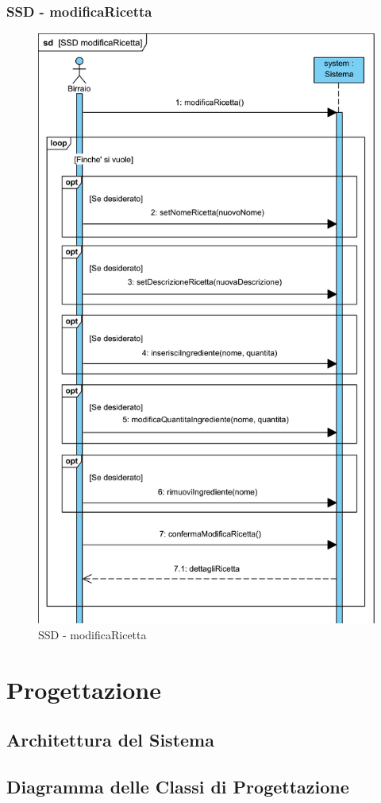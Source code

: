\documentclass[a4paper,12pt]{report}
\begin{document}
		\subsection{SSD - modificaRicetta}
			\begin{figure}[!h]
				\centering
				\includegraphics[width=0.8\linewidth]{image/SSD-modificaRicetta.png}
				\caption{SSD - modificaRicetta}\label{fig:1}
			\end{figure}


      \chapter{Progettazione}
         \section{Architettura del Sistema}
         \section{Diagramma delle Classi di Progettazione}
         
\end{document}
